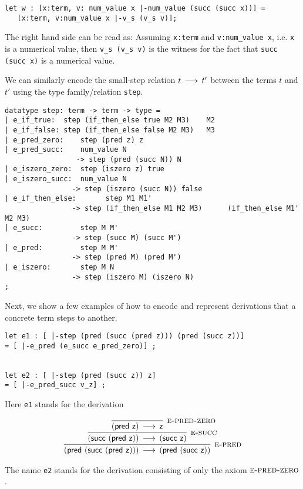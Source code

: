 \begin{lstlisting}
let w : [x:term, v: num_value x |-num_value (succ (succ x))] =
   [x:term, v:num_value x |-v_s (v_s v)];
\end{lstlisting}

The right hand side can be read as: Assuming \lstinline!x:term! and
\lstinline!v:num_value x!, i.e. \lstinline!x! is a numerical value, then
\lstinline!v_s (v_s v)! is the witness for the fact that
\lstinline!succ (succ x)! is a numerical value.


We can similarly encode the small-step relation $t \mathrel{\,\longrightarrow\,} t'$ between the terms
$t$ and $t'$ using the type family/relation \lstinline!step!.

\begin{lstlisting}
datatype step: term -> term -> type =
| e_if_true:  step (if_then_else true M2 M3)    M2
| e_if_false: step (if_then_else false M2 M3)   M3
| e_pred_zero:    step (pred z) z
| e_pred_succ:    num_value N
                 -> step (pred (succ N)) N
| e_iszero_zero:  step (iszero z) true
| e_iszero_succ:  num_value N
                -> step (iszero (succ N)) false
| e_if_then_else:       step M1 M1'
                -> step (if_then_else M1 M2 M3)      (if_then_else M1' M2 M3)
| e_succ:         step M M'
                -> step (succ M) (succ M')
| e_pred:         step M M'
                -> step (pred M) (pred M')
| e_iszero:       step M N
                -> step (iszero M) (iszero N)
;
\end{lstlisting}


Next, we show a few examples of how to encode and represent
derivations that a concrete term steps to another.

\begin{lstlisting}
let e1 : [ |-step (pred (succ (pred z))) (pred (succ z))]
= [ |-e_pred (e_succ e_pred_zero)] ;


let e2 : [ |-step (pred (succ z)) z]
= [ |-e_pred_succ v_z] ;
\end{lstlisting}


Here \lstinline!e1! stands for the derivation


\[
\begin{array}{c}
\infer[\SPRED]{(\tmpred {(\tmsucc {(\tmpred {\tmzero})})}) \steps (\tmpred {(\tmsucc {\tmzero})})}
{\infer[\SSUC]{(\tmsucc {(\tmpred {\tmzero})}) \steps (\tmsucc {\tmzero} )}
 {\infer[\SPREDZ]{(\tmpred {\tmzero}) \steps \tmzero}{}}
}
\end{array}
\]

The name \lstinline!e2! stands for the derivation consisting of only
the axiom $\textsc{e-pred-zero}$.


